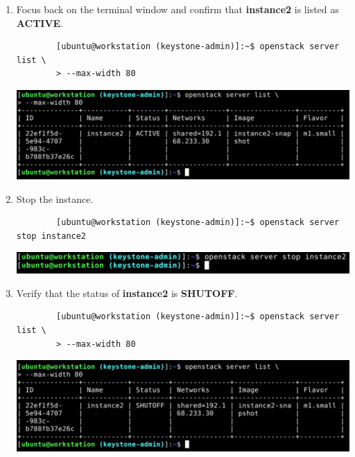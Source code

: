 \documentclass[letterpaper, 12pt]{article}
\begin{document}
\begin{enumerate}
    \item Focus back on the terminal window and confirm that \textbf{instance2} is listed as \textbf{ACTIVE}.
    \begin{lstlisting}
        [ubuntu@workstation (keystone-admin)]:~$ openstack server list \
        > --max-width 80
    \end{lstlisting}
    
    \begin{center}
        \includegraphics[width=\linewidth]{images/part4/step16.png}
    \end{center}

    \item Stop the instance.
    \begin{lstlisting}
        [ubuntu@workstation (keystone-admin)]:~$ openstack server stop instance2
    \end{lstlisting}

    \begin{center}
        \includegraphics[width=\linewidth]{images/part4/step17.png}
    \end{center}

    \item Verify that the status of \textbf{instance2} is \textbf{SHUTOFF}.
    \begin{lstlisting}
        [ubuntu@workstation (keystone-admin)]:~$ openstack server list \
        > --max-width 80
    \end{lstlisting}

    \begin{center}
        \includegraphics[width=\linewidth]{images/part4/step18.png}
    \end{center}


\end{enumerate}
\end{document}

